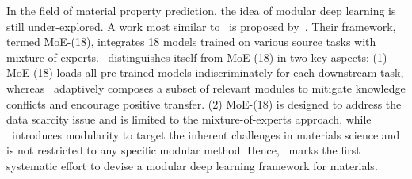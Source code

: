 In the field of material property prediction, the idea of modular deep learning is still under-explored. A work most similar to \name \ is proposed by~\citet{chang2022towards}. Their framework, termed MoE-(18), integrates 18 models trained on various source tasks with mixture of experts. \name \ distinguishes itself from MoE-(18) in two key aspects:
(1) MoE-(18) loads all pre-trained models indiscriminately for each downstream task, whereas \name \ adaptively composes a subset of relevant modules to mitigate knowledge conflicts and encourage positive transfer.
(2) MoE-(18) is designed to address the data scarcity issue and is limited to the mixture-of-experts approach, while \name \ introduces modularity to target the inherent challenges in materials science and is not restricted to any specific modular method.
Hence, \name \ marks the first systematic effort to devise a modular deep learning framework for materials.